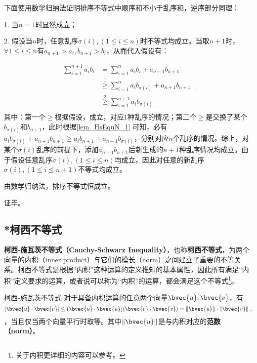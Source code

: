 下面使用数学归纳法证明排序不等式中顺序和不小于乱序和，逆序部分同理：

1. 当$n=1$时显然成立；

2. 假设当$n$时，任意乱序$\sigma(i),(1\leq i\leq n)$时不等式均成立。当取$n+1$时，$\forall 1\leq i\leq n$有$a_{n+1}>a_i,b_{n+1}>b_i$，从而代入假设有：

\begin{equation}
\begin{split}
\sum_{i=1}^{n+1} a_i b_i&=\sum_{i=1}^n a_i b_i+a_{n+1}b_{n+1}\\
&\overset{\mathrm{1}}{\geq} \sum_{i=1}^n a_i b_{\sigma(i)} +a_{n+1}b_{n+1} \\ 
&\overset{\mathrm{2}}{\geq} \sum_{i=1}^{n+1} a_i b_{\sigma(i)} \\
\end{split}~.
\end{equation}
其中：第一个$\geq$根据假设，成立，对应$1$种乱序的情况；第二个$\geq$是交换了某个$b_{\sigma(i)}$和$b_{n+1}$，此时根据\autoref{lem_HsEquN_1} 可知，必有$a_i b_{\sigma(i)}+a_{n+1}b_{n+1}\geq a_ib_{n+1} +a_{n+1}b_{\sigma(i)}$，分别对应$n$个乱序的情况。综上，对某个$\sigma(i)$乱序的前提下，添加$a_{n+1}b_{n+1}$后新生成的$n+1$种乱序情况均成立。由于假设任意乱序$\sigma(i),(1\leq i\leq n)$均成立，因此对任意的新乱序$\sigma(i),(1\leq i\leq n+1)$不等式均成立。

由数学归纳法，排序不等式恒成立。

证毕。

\subsection{*柯西不等式}


\textbf{柯西-施瓦茨不等式（Cauchy-Schwarz Inequality）}，也称\textbf{柯西不等式}，为两个向量的内积（inner product）与它们的模长（norm）之间建立了重要的不等关系。柯西不等式是根据“内积”这种运算的定义推知的基本属性，因此所有满足“内积”定义要求的运算，或者说可以称为“内积”的运算，都会满足这个不等式\footnote{关于内积更详细的内容可以参考。}。

\begin{theorem}{柯西-施瓦茨不等式}
对于具备内积运算的任意两个向量$\bvec{u},\bvec{v}$，有
\begin{equation}
|\bvec{u} \cdot \bvec{v}| \leq (\bvec{u}\cdot\bvec{u})(\bvec{v}\cdot\bvec{v})=\|\bvec{u}\|\cdot\|\bvec{v}\|~.
\end{equation}
，当且仅当两个向量平行时取等。其中$\|\bvec{u}\|$是与内积对应的\textbf{范数（norm）}。
\end{theorem}

